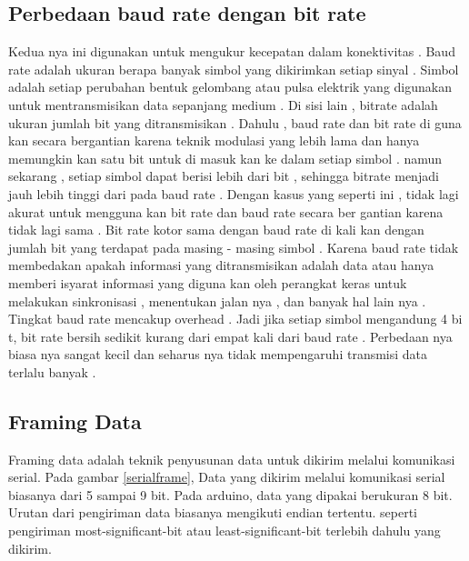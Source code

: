 \subsection{ Perbedaan baud rate dengan bit rate }
Kedua nya ini digunakan untuk mengukur kecepatan dalam konektivitas . Baud rate adalah ukuran berapa banyak simbol yang dikirimkan setiap sinyal . Simbol adalah setiap perubahan bentuk gelombang atau pulsa elektrik yang digunakan untuk mentransmisikan data sepanjang medium . Di sisi lain , bitrate adalah ukuran jumlah bit yang ditransmisikan . Dahulu , baud rate dan bit rate di guna kan secara bergantian karena teknik modulasi yang lebih lama dan  hanya memungkin kan satu bit untuk di masuk kan ke dalam setiap simbol . namun sekarang , setiap simbol dapat berisi lebih dari bit , sehingga bitrate menjadi jauh lebih tinggi dari pada baud rate . Dengan kasus yang seperti ini , tidak lagi akurat untuk mengguna kan bit rate dan baud rate secara ber gantian karena tidak lagi sama . Bit rate kotor sama dengan baud rate di kali kan dengan jumlah bit yang terdapat pada masing - masing simbol .
Karena baud rate tidak membedakan apakah informasi yang ditransmisikan adalah data atau hanya memberi isyarat informasi yang diguna kan oleh perangkat keras untuk melakukan sinkronisasi , menentukan jalan nya , dan banyak hal lain nya . Tingkat baud rate mencakup overhead . Jadi jika setiap simbol mengandung 4 bi t, bit rate bersih sedikit kurang dari empat kali dari baud rate . Perbedaan nya biasa nya sangat kecil dan seharus nya tidak mempengaruhi transmisi data terlalu banyak .

\subsection{Framing Data}
Framing data adalah teknik penyusunan data untuk dikirim melalui komunikasi serial. Pada gambar \ref{serialframe}, Data yang dikirim melalui komunikasi serial biasanya dari 5 sampai 9 bit. Pada arduino, data yang dipakai berukuran 8 bit. Urutan dari pengiriman data biasanya mengikuti endian tertentu. seperti pengiriman most-significant-bit atau least-significant-bit terlebih dahulu yang dikirim.
